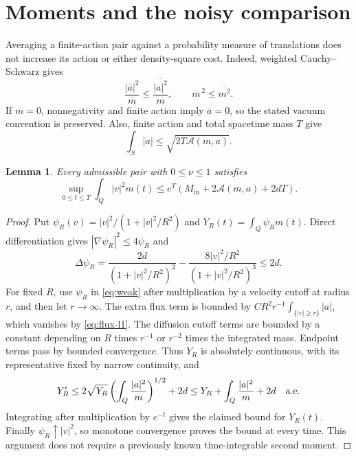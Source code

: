 \documentclass[11pt]{article}
\newtheorem{lemma}{Lemma}
\newcommand{\A}{\mathcal A}
\begin{document}
\section{Moments and the noisy comparison}

Averaging a finite-action pair against a probability measure of translations
does not increase its action or either density-square cost. Indeed, weighted
Cauchy--Schwarz gives
\begin{equation}\label{eq:jensen}
 \frac{|\overline a|^2}{\overline m}
 \leq\overline{\frac{|a|^2}{m}},\qquad
 \overline m^{\,2}\leq\overline{m^2}.
\end{equation}
If $\overline m=0$, nonnegativity and finite action imply
$\overline a=0$, so the stated vacuum convention is preserved.
Also, finite action and total spacetime mass $T$ give
\begin{equation}\label{eq:flux-l1}
 \int_S|a|\leq\sqrt{2T\A(m,a)}.
\end{equation}

\begin{lemma}\label{lem:moment}
Every admissible pair with $0\leq\nu\leq1$ satisfies
\[
 \sup_{0\leq t\leq T}\int_Q|v|^2m(t)
 \leq e^T\left(M_{\mathrm{in}}+2\A(m,a)+2dT\right).
\]
\end{lemma}

\begin{proof}
Put $\psi_R(v)=|v|^2/(1+|v|^2/R^2)$ and
$Y_R(t)=\int_Q\psi_Rm(t)$. Direct differentiation gives
$|\nabla\psi_R|^2\leq4\psi_R$ and
\[
 \Delta\psi_R=
 \frac{2d}{(1+|v|^2/R^2)^2}
 -\frac{8|v|^2/R^2}{(1+|v|^2/R^2)^3}\leq2d.
\]
For fixed $R$, use $\psi_R$ in \eqref{eq:weak} after multiplication
by a velocity cutoff at radius $r$, and then let $r\to\infty$.
The extra flux term is bounded by
$CR^2r^{-1}\int_{\{|v|\geq r\}}|a|$, which vanishes by
\eqref{eq:flux-l1}. The diffusion cutoff terms are bounded by a constant
depending on $R$ times $r^{-1}$ or $r^{-2}$ times the integrated mass.
Endpoint terms pass by bounded convergence. Thus $Y_R$ is absolutely
continuous, with its representative fixed by narrow continuity, and
\[
 Y_R'\leq
 2\sqrt{Y_R}\left(\int_Q\frac{|a|^2}{m}\right)^{1/2}+2d
 \leq Y_R+\int_Q\frac{|a|^2}{m}+2d
 \quad\hbox{a.e.}
\]
Integrating after multiplication by $e^{-t}$ gives the claimed bound for
$Y_R(t)$. Finally $\psi_R\uparrow|v|^2$, so monotone convergence proves
the bound at every time. This argument does not require a previously
known time-integrable second moment.
\end{proof}
\end{document}

